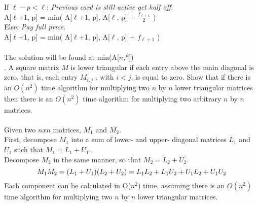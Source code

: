 \documentclass[10pt]{article}
\newcommand{\tabb}{\hspace*{4em}}
\newcommand{\tabbb}{\hspace*{6em}}
\begin{document}
		\tabb If $\ell - p < \ell$: \emph{Previous card is still active get half off.}\\
		\tabbb A[$\ell$+1, p] = min( A[$\ell$+1, p], A[$\ell$, p] + $\frac{f_{\ell+1}}{2}$ )\\
		\tabb Else: \emph{Pay full price.}\\
		\tabbb A[$\ell$+1, p] = min( A[$\ell$+1, p], A[$\ell$, p] + $f_{\ell+1}$ )\\
		\\
		The solution will be found at min(A[$n$,*])\\
	.	A square matrix $M$ is lower triangular if each entry above the main diagonal is zero, that is, each entry
		$M_{i,j}$ , with $i < j$, is equal to zero. Show that if there is an $O(n^2)$ time algorithm for multiplying two $n$
		by $n$ lower triangular matrices then there is an $O(n^2)$ time algorithm for multiplying two arbitrary $n$
		by $n$ matrices.\\
		\\
		Given two $nxn$ matrices, $M_1$ and $M_2$.\\
		First, decompose $M_1$ into a sum of lower- and upper- diagonal matrices $L_1$ and $U_1$ such that $M_1 = L_1 + U_1$.\\
		Decompose $M_2$ in the same manner, so that $M_2 = L_2 + U_2$.\\
		\[
		M_1M_2 = (L_1 + U_1)(L_2 + U_2)\\
		= L_1L_2 + L_1U_2 + U_1L_2 + U_1U_2\\
		\]
		Each component can be calculated in O($n^2$) time, assuming there is an $O(n^2)$ time algorithm for multiplying
		two $n$ by $n$ lower triangular matrices.\\
\end{document}
